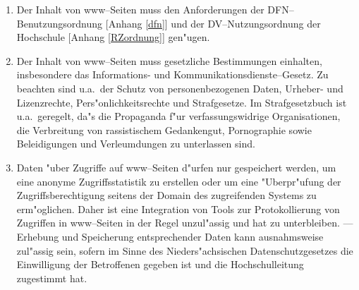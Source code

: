 \begin{enumerate}
  \item Der Inhalt von www--Seiten muss den Anforderungen der
        DFN--Benutzungsordnung [Anhang \ref{dfn}] und der DV--Nutzungsordnung
        der Hochschule [Anhang \ref{RZordnung}] gen"ugen.

  \item Der Inhalt von www--Seiten muss gesetzliche Bestimmungen einhalten,
        insbesondere das Informations- und Kommunikationsdienste--Gesetz.
        Zu beachten sind u.a.\  der Schutz von personenbezogenen Daten,
        Urheber- und Lizenzrechte, Pers"onlichkeitsrechte und
        Strafgesetze. Im Strafgesetzbuch ist u.a.\  geregelt, da"s
        die Propaganda f"ur verfassungswidrige Organisationen, die
        Verbreitung von rassistischem Gedankengut, Pornographie sowie
        Beleidigungen und Verleumdungen zu unterlassen sind.

  \item Daten "uber Zugriffe auf www--Seiten d"urfen nur gespeichert
        werden, um eine anonyme Zugriffsstatistik zu erstellen oder
        um eine "Uberpr"ufung der Zugriffsberechtigung seitens
        der Domain des zugreifenden Systems zu erm"oglichen.
        Daher ist eine Integration von Tools zur Protokollierung von
        Zugriffen in www--Seiten in der Regel unzul"assig und hat
        zu unterbleiben. --- Erhebung und Speicherung entsprechender Daten
        kann ausnahmsweise zul"assig sein, sofern im Sinne des
        Nieders"achsischen Datenschutzgesetzes
        die Einwilligung der Betroffenen gegeben ist und die
        Hochschulleitung zugestimmt hat.


\end{enumerate}
